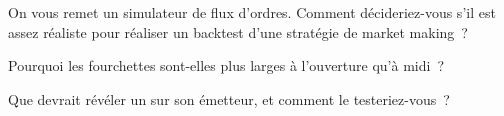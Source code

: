 \begin{interviewq}\label{iq:mx:empirical-facts-of-order-books:4}
On vous remet un simulateur de flux d'ordres. Comment décideriez-vous s'il est assez réaliste pour réaliser un backtest d'une stratégie de market making~?
\end{interviewq}

\begin{interviewq}\label{iq:mx:empirical-facts-of-order-books:5}
Pourquoi les fourchettes sont-elles plus larges à l'ouverture qu'à midi~?
\end{interviewq}

\begin{interviewq}\label{iq:mx:empirical-facts-of-order-books:6}
Que devrait révéler un  sur son émetteur, et comment le testeriez-vous~?
\end{interviewq}
